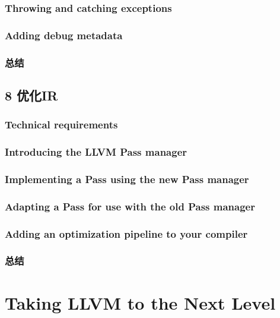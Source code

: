 \documentclass[11pt,a4paper,UTF8]{ctexart}
\begin{document}
		\subsubsection{Throwing and catching exceptions}
		\subsubsection{Adding debug metadata}
		\subsubsection{总结}
	\subsection{8 优化IR}
		\subsubsection{Technical requirements}
		\subsubsection{Introducing the LLVM Pass manager}
		\subsubsection{Implementing a Pass using the new Pass manager}
		\subsubsection{Adapting a Pass for use with the old Pass manager}
		\subsubsection{Adding an optimization pipeline to your compiler}
		\subsubsection{总结}
	
	\section{Taking LLVM to the Next Level}
\end{document}
